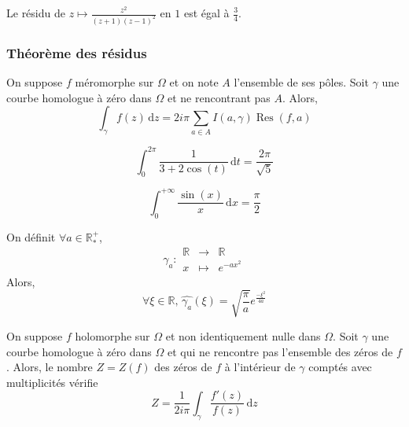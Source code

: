   \begin{example}
    Le résidu de $z \mapsto \frac{z^2}{(z+1)(z-1)^2}$ en $1$ est égal à $\frac{3}{4}$.
  \end{example}

  \subsubsection{Théorème des résidus}

  \begin{theorem}
    On suppose $f$ méromorphe sur $\Omega$ et on note $A$ l'ensemble de ses pôles. Soit $\gamma$ une courbe homologue à zéro dans $\Omega$ et ne rencontrant pas $A$. Alors,
    \[ \int_\gamma f(z) \, \mathrm{d}z = 2i\pi \sum_{a \in A} I(a, \gamma) \operatorname{Res}(f, a) \]
  \end{theorem}


  \begin{example}
    \[ \int_{0}^{2\pi} \frac{1}{3 + 2\cos(t)} \, \mathrm{d}t = \frac{2\pi}{\sqrt{5}} \]
  \end{example}

  \begin{example}
    \[ \int_{0}^{+\infty} \frac{\sin(x)}{x} \, \mathrm{d}x = \frac{\pi}{2} \]
  \end{example}


  \begin{example}
    On définit $\forall a \in \mathbb{R}^+_*$,
    \[ \gamma_a :
    \begin{array}{ccc}
      \mathbb{R} &\rightarrow& \mathbb{R} \\
      x &\mapsto& e^{-ax^2}
    \end{array}
    \]
    Alors,
    \[ \forall \xi \in \mathbb{R}, \, \widehat{\gamma_a}(\xi) = \sqrt{\frac{\pi}{a}} e^{\frac{- \xi^2}{4a}} \]
  \end{example}


  \begin{application}
    On suppose $f$ holomorphe sur $\Omega$ et non identiquement nulle dans $\Omega$. Soit $\gamma$ une courbe homologue à zéro dans $\Omega$ et qui ne rencontre pas l'ensemble des zéros de $f$. Alors, le nombre $Z = Z(f)$ des zéros de $f$ à l'intérieur de $\gamma$ comptés avec multiplicités vérifie
    \[ Z = \frac{1}{2i\pi} \int_\gamma \frac{f'(z)}{f(z)} \, \mathrm{d}z \]
  \end{application}

